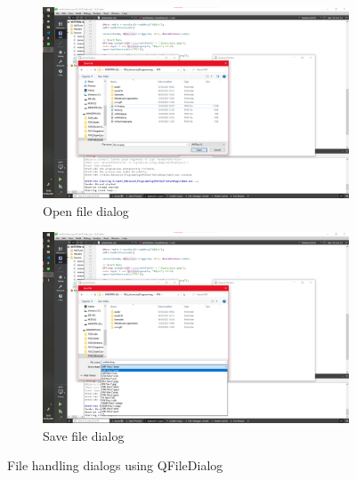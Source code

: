 \documentclass[10pt]{article}
\newcommand{\figsquish}{\vspace{-5mm}} %
\begin{document}
\begin{multicols*}{2}
\begin{figure}[H]
	\centering
	\begin{subfigure}[t]{0.48\columnwidth}

		\includegraphics[width=\columnwidth]{./open.png}
		\caption{Open file dialog}
		\label{fig:open}
	\end{subfigure}
	\hfill
	\begin{subfigure}[t]{0.48\columnwidth}

		\includegraphics[width=\columnwidth]{./save.png}
		\caption{Save file dialog}
		\label{fig:save}
	\end{subfigure}
	\caption{File handling dialogs using QFileDialog}
	\label{fig:fileDialogs}
\end{figure}
\figsquish

\begin{figure}[H]
	\centering
	\begin{subfigure}[t]{0.48\columnwidth}


\end{subfigure}
\end{figure}
\end{multicols*}
\end{document}
